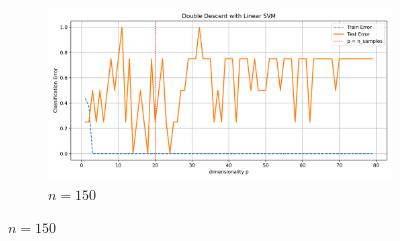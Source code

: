\documentclass[twoside,10pt]{article}
\begin{document}
\begin{figure}[htb]
\begin{subfigure}[b]{\imgwidth}
  \end{subfigure}%
  \hfill
  \begin{subfigure}[b]{\imgwidth}
    \includegraphics[width=\linewidth]{img_qq/risk_curve_n140.png}
    \caption{$n=150$}\label{fig:2l1}
  \end{subfigure}

  \medskip


\end{figure}
\end{document}
